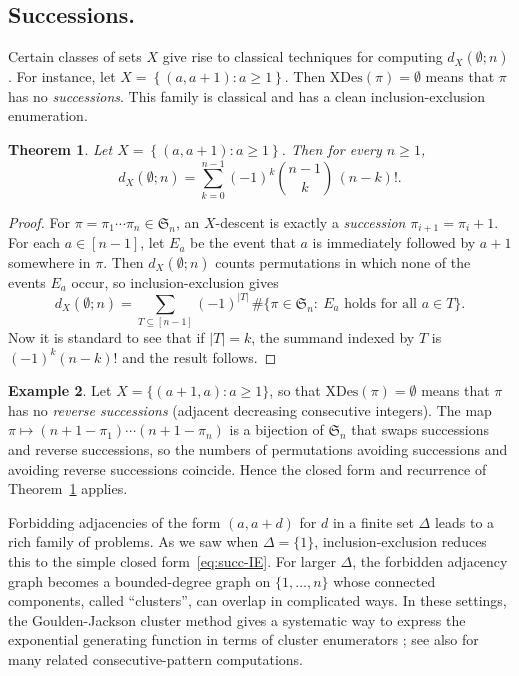 \documentclass[12pt]{amsart}
\newtheorem{theorem}{Theorem}[section]
\theoremstyle{definition}
\newtheorem{example}[theorem]{Example}
\theoremstyle{remark}
\newcommand{\Sset}{\mathfrak{S}}
\newcommand{\XD}{\mathrm{XDes}}
\newcommand{\set}[1]{\left\{#1\right\}}
\newcommand{\abs}[1]{\left|#1\right|}
\begin{document}
\subsection{Successions.}
Certain classes of sets $X$ give rise to classical techniques for computing $d_X(\emptyset;n)$. For instance, let $X=\set{(a,a+1):a\ge 1}$.
Then $\XD(\pi)=\emptyset$ means that $\pi$ has no \emph{successions}.
This family is classical and has a clean inclusion-exclusion enumeration.

\begin{theorem}\label{thm:delta-egf-corrected}
Let $X=\set{(a,a+1):a\ge 1}$. Then for every $n\ge 1$,
\begin{equation}\label{eq:succ-IE}
d_X(\emptyset;n)=\sum_{k=0}^{n-1}(-1)^k \binom{n-1}{k}\,(n-k)!.
\end{equation}
\end{theorem}

\begin{proof}
For \(\pi=\pi_1\cdots\pi_n\in\Sset_n\), an \(X\)-descent is exactly a \emph{succession} \(\pi_{i+1}=\pi_i+1\).
For each \(a\in[n-1]\), let \(E_a\) be the event that \(a\) is immediately followed by \(a+1\) somewhere in \(\pi\).
Then \(d_X(\emptyset;n)\) counts permutations in which none of the events \(E_a\) occur, so inclusion-exclusion gives
\[
d_X(\emptyset;n)=\sum_{T\subseteq[n-1]} (-1)^{\abs{T}}\,
\#\{\pi\in\Sset_n:\ E_a\text{ holds for all }a\in T\}.
\]
Now it is standard to see that if $|T|=k$, the summand indexed by $T$ is $(-1)^k(n-k)!$ and the result follows.
\end{proof}


\begin{example}Let $X=\{(a{+}1,a):a\ge 1\}$, so that $\XD(\pi)=\emptyset$ means that $\pi$ has no \emph{reverse successions}
(adjacent decreasing consecutive integers).
The map $\pi\mapsto (n{+}1-\pi_1)\cdots(n{+}1-\pi_n)$ is a bijection of $\Sset_n$ that swaps successions and reverse
successions, so the numbers of permutations avoiding successions and avoiding reverse successions coincide.
Hence the closed form and recurrence of Theorem~\ref{thm:delta-egf-corrected} applies.
\end{example}


Forbidding adjacencies of the form $(a,a+d)$ for $d$ in a finite set $\Delta$ leads to a rich family of problems.
As we saw when $\Delta=\{1\}$, inclusion-exclusion reduces this 
to the simple closed form~\eqref{eq:succ-IE}.  For larger $\Delta$, the forbidden adjacency graph becomes a
bounded-degree graph on $\{1,\dots,n\}$ whose connected components, called ``clusters'', can overlap in complicated ways.
In these settings, the Goulden-Jackson cluster method gives a systematic way to express the exponential generating
function in terms of cluster enumerators \cite{goulden-jackson,flajolet-sedgewick}; see also \cite{bona-permutations}
for many related consecutive-pattern computations.
\end{document}
